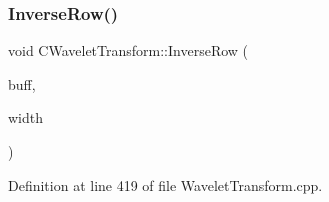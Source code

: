 \mbox{\label{classCWaveletTransform_a1a39a469fd695c50efc42d744689982d}} 
\subsubsection{\texorpdfstring{InverseRow()}{InverseRow()}}
{\footnotesize\ttfamily void C\+Wavelet\+Transform\+::\+Inverse\+Row (\begin{DoxyParamCaption}\item[{\mbox{\hyperlink{PGFtypes_8h_acb1ee3f52ccfad782dcaa0abd79e5d05}{DataT}} $\ast$}]{buff,  }\item[{U\+I\+N\+T32}]{width }\end{DoxyParamCaption})\hspace{0.3cm}{\ttfamily [private]}}



Definition at line 419 of file Wavelet\+Transform.\+cpp.


